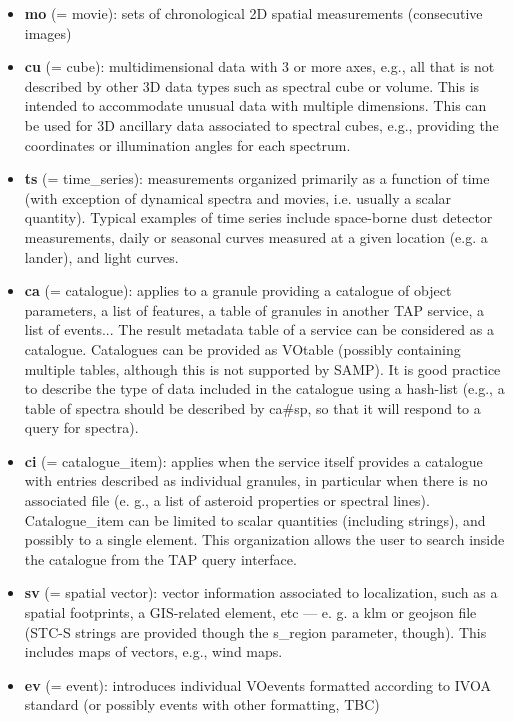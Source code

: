 \documentclass[11pt,a4paper]{ivoa}
\begin{document}
\begin{itemize}
\item \textbf{mo }(= movie): sets of chronological 2D spatial measurements (consecutive images)

\item \textbf{cu }(= cube): multidimensional data with 3 or more axes, e.g., all that is not described by other 3D data types such as spectral cube or volume. This is intended to accommodate unusual data with multiple dimensions. This can be used for 3D ancillary data associated to spectral cubes, e.g., providing the coordinates or illumination angles for each spectrum.

\item \textbf{ts }(= time\_series): measurements organized primarily as a function of time (with exception of dynamical spectra and movies, i.e. usually a scalar quantity). Typical examples of time series include space-borne dust detector measurements, daily or seasonal curves measured at a given location (e.g. a lander), and light curves.

\item \textbf{ca }(= catalogue): applies to a granule providing a catalogue of object parameters, a list of features, a table of granules in another TAP service, a list of events... The result metadata table of a service can be considered as a catalogue. Catalogues can be provided as VOtable (possibly containing multiple tables, although this is not supported by SAMP). It is good practice to describe the type of data included in the catalogue using a hash-list (e.g., a table of spectra should be described by ca\#sp, so that it will respond to a query for spectra).

\item \textbf{ci }(= catalogue\_item): applies when the service itself provides a catalogue with entries described as individual granules, in particular when there is no associated file (e. g., a list of asteroid properties or spectral lines). Catalogue\_item can be limited to scalar quantities (including strings), and possibly to a single element. This organization allows the user to search inside the catalogue from the TAP query interface.

\item \textbf{sv} (= spatial vector): vector information associated to localization, such as a spatial footprints, a GIS-related element, etc —  e. g. a klm or geojson file (STC-S strings are provided though the s\_region parameter, though). This includes maps of vectors, e.g., wind maps.

\item \textbf{ev} (= event): introduces individual VOevents formatted according to IVOA standard (or possibly events with other formatting, TBC)

\end{itemize}
\end{document}
